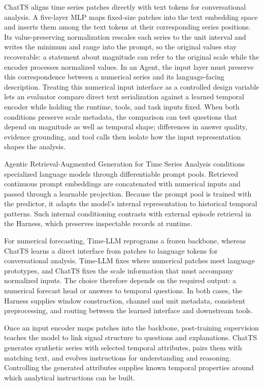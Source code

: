 \documentclass[preprints,article,submit,moreauthors]{Definitions/mdpi}
\begin{document}
ChatTS \citep{chatts2025} aligns time series patches directly with text tokens for conversational analysis. A five-layer MLP maps fixed-size patches into the text embedding space and inserts them among the text tokens at their corresponding series positions. Its value-preserving normalization rescales each series to the unit interval and writes the minimum and range into the prompt, so the original values stay recoverable: a statement about magnitude can refer to the original scale while the encoder processes normalized values. In an Agent, the input layer must preserve this correspondence between a numerical series and its language-facing description. Treating this numerical input interface as a controlled design variable lets an evaluator compare direct text serialization against a learned temporal encoder while holding the runtime, tools, and task inputs fixed. When both conditions preserve scale metadata, the comparison can test questions that depend on magnitude as well as temporal shape; differences in answer quality, evidence grounding, and tool calls then isolate how the input representation shapes the analysis.

Agentic Retrieval-Augmented Generation for Time Series Analysis \citep{agenticrag2024} conditions specialized language models through differentiable prompt pools. Retrieved continuous prompt embeddings are concatenated with numerical inputs and passed through a learnable projection. Because the prompt pool is trained with the predictor, it adapts the model's internal representation to historical temporal patterns. Such internal conditioning contrasts with external episode retrieval in the Harness, which preserves inspectable records at runtime.

For numerical forecasting, Time-LLM \citep{jin2024timellm} reprograms a frozen backbone, whereas ChatTS \citep{chatts2025} learns a direct interface from patches to language tokens for conversational analysis. Time-LLM fixes where numerical patches meet language prototypes, and ChatTS fixes the scale information that must accompany normalized inputs. The choice therefore depends on the required output: a numerical forecast head or answers to temporal questions. In both cases, the Harness supplies window construction, channel and unit metadata, consistent preprocessing, and routing between the learned interface and downstream tools.

Once an input encoder maps patches into the backbone, post-training supervision teaches the model to link signal structure to questions and explanations. ChatTS \citep{chatts2025} generates synthetic series with selected temporal attributes, pairs them with matching text, and evolves instructions for understanding and reasoning. Controlling the generated attributes supplies known temporal properties around which analytical instructions can be built.
\end{document}
